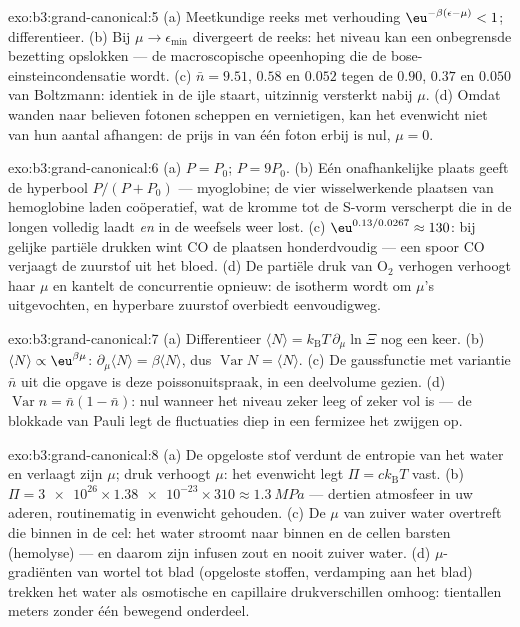 \begin{solution}{exo:b3:grand-canonical:5}
(a) Meetkundige reeks met verhouding $\eu^{-\beta(\epsilon-\mu)} < 1$;
differentieer. (b) Bij $\mu \to \epsilon_{\min}$ divergeert de reeks: het
niveau kan een onbegrensde bezetting opslokken --- de macroscopische
opeenhoping die de bose-einsteincondensatie wordt. (c) $\bar n = 9.51$,
$0.58$ en $0.052$ tegen de $0.90$, $0.37$ en $0.050$ van Boltzmann:
identiek in de ijle staart, uitzinnig versterkt nabij $\mu$. (d) Omdat
wanden naar believen fotonen scheppen en vernietigen, kan het evenwicht
niet van hun aantal afhangen: de prijs in  van één foton erbij
is nul, $\mu = 0$.
\end{solution}

\begin{solution}{exo:b3:grand-canonical:6}
(a) $P = P_0$; $P = 9P_0$. (b) Eén onafhankelijke plaats geeft de
hyperbool $P/(P + P_0)$ --- myoglobine; de vier wisselwerkende plaatsen van
hemoglobine laden coöperatief, wat de kromme tot de S-vorm verscherpt die
in de longen volledig laadt \emph{en} in de weefsels weer lost. (c)
$\eu^{0.13/0.0267} \approx 130$: bij gelijke partiële drukken wint CO de
plaatsen honderdvoudig --- een spoor CO verjaagt de zuurstof uit het bloed.
(d) De partiële druk van O$_2$ verhogen verhoogt haar $\mu$ en kantelt de
concurrentie opnieuw: de isotherm wordt om $\mu$'s uitgevochten, en
hyperbare zuurstof overbiedt eenvoudigweg.
\end{solution}

\begin{solution}{exo:b3:grand-canonical:7}
(a) Differentieer $\langle N\rangle = k_{\text{B}}T\,\partial_\mu
\ln\Xi$ nog een keer. (b) $\langle N\rangle \propto
\eu^{\beta\mu}$: $\partial_\mu\langle N\rangle = \beta\langle
N\rangle$, dus $\operatorname{Var}N = \langle N\rangle$. (c) De
gaussfunctie met variantie $\bar n$ uit die opgave is deze
poissonuitspraak, in een deelvolume gezien. (d) $\operatorname{Var}n =
\bar n(1 - \bar n)$: nul wanneer het niveau zeker leeg of zeker vol is ---
de blokkade van Pauli legt de fluctuaties diep in een fermizee het zwijgen
op.
\end{solution}

\begin{solution}{exo:b3:grand-canonical:8}
(a) De opgeloste stof verdunt de entropie van het water en verlaagt zijn
$\mu$; druk verhoogt $\mu$: het evenwicht legt $\Pi = ck_{\text{B}}T$ vast.
(b) $\Pi =
\num{3e26} \times \num{1.38e-23} \times 310 \approx
\qty{1.3}{MPa}$ --- dertien atmosfeer in uw aderen, routinematig in
evenwicht gehouden. (c) De $\mu$ van zuiver water overtreft die binnen in
de cel: het water stroomt naar binnen en de cellen barsten (hemolyse) ---
en daarom zijn infusen zout en nooit zuiver water. (d)
$\mu$-gradiënten van wortel tot blad (opgeloste stoffen, verdamping aan het
blad) trekken het water als osmotische en capillaire drukverschillen
omhoog: tientallen meters zonder één bewegend onderdeel.
\end{solution}

